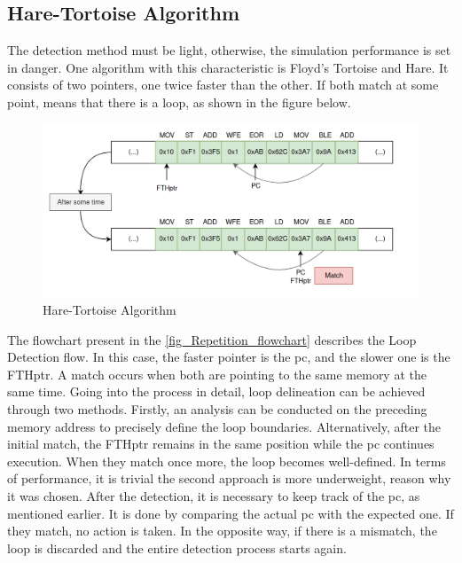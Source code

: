 \subsection{Hare-Tortoise Algorithm}

The detection method must be light, otherwise, the simulation performance is set in danger. One algorithm with this characteristic is Floyd's 
Tortoise and Hare. It consists of two pointers, one twice faster than the other. If both match at some point, means that there is a 
loop, as shown in the figure below.

\begin{figure}[H]
	\centering
 	\includegraphics[width=0.8\linewidth]{Images/FTH_algorithm.png}
 	\caption{Hare-Tortoise Algorithm}
	 \label{fig_FTH_algorithm}
\end{figure}

The flowchart present in the \autoref{fig_Repetition_flowchart} describes the Loop Detection flow. 
In this case, the faster pointer is the \gls{pc}, and the slower one is the FTHptr. A match occurs when both are pointing to the same memory at 
the same time. Going into the process in detail, loop delineation can be achieved through two methods. Firstly, an analysis can be conducted on 
the preceding memory address to precisely define the loop boundaries. Alternatively, after the initial match, the FTHptr remains in the same position 
while the \gls{pc} continues execution. When they match once more, the loop becomes well-defined. In terms of performance, it is trivial the 
second approach is more underweight, reason why it was chosen. After the detection, it is necessary to keep track of the \gls{pc}, as mentioned 
earlier. It is done by comparing the actual \gls{pc} with the expected one. If they match, no action is taken. In the opposite way, if there 
is a mismatch, the loop is discarded and the entire detection process starts again.

